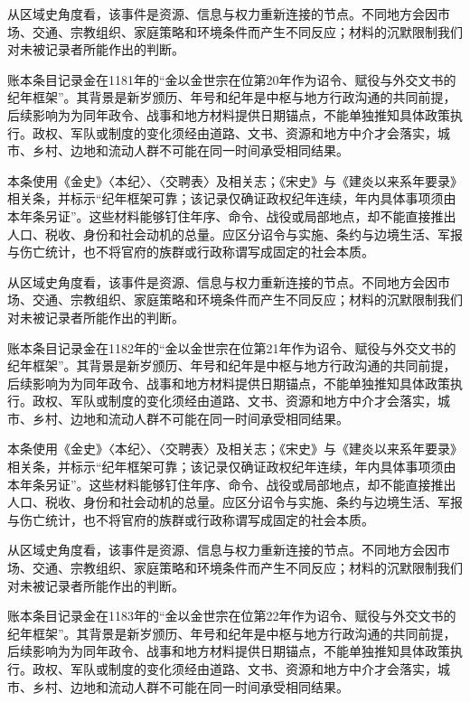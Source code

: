 从区域史角度看，该事件是资源、信息与权力重新连接的节点。不同地方会因市场、交通、宗教组织、家庭策略和环境条件而产生不同反应；材料的沉默限制我们对未被记录者所能作出的判断。

账本条目记录金在1181年的“金以金世宗在位第20年作为诏令、赋役与外交文书的纪年框架”。其背景是新岁颁历、年号和纪年是中枢与地方行政沟通的共同前提，后续影响为为同年政令、战事和地方材料提供日期锚点，不能单独推知具体政策执行。政权、军队或制度的变化须经由道路、文书、资源和地方中介才会落实，城市、乡村、边地和流动人群不可能在同一时间承受相同结果。

本条使用《金史》〈本纪〉、〈交聘表〉及相关志；《宋史》与《建炎以来系年要录》相关条，并标示“纪年框架可靠；该记录仅确证政权纪年连续，年内具体事项须由本年条另证”。这些材料能够钉住年序、命令、战役或局部地点，却不能直接推出人口、税收、身份和社会动机的总量。应区分诏令与实施、条约与边境生活、军报与伤亡统计，也不将官府的族群或行政称谓写成固定的社会本质。

从区域史角度看，该事件是资源、信息与权力重新连接的节点。不同地方会因市场、交通、宗教组织、家庭策略和环境条件而产生不同反应；材料的沉默限制我们对未被记录者所能作出的判断。

账本条目记录金在1182年的“金以金世宗在位第21年作为诏令、赋役与外交文书的纪年框架”。其背景是新岁颁历、年号和纪年是中枢与地方行政沟通的共同前提，后续影响为为同年政令、战事和地方材料提供日期锚点，不能单独推知具体政策执行。政权、军队或制度的变化须经由道路、文书、资源和地方中介才会落实，城市、乡村、边地和流动人群不可能在同一时间承受相同结果。

本条使用《金史》〈本纪〉、〈交聘表〉及相关志；《宋史》与《建炎以来系年要录》相关条，并标示“纪年框架可靠；该记录仅确证政权纪年连续，年内具体事项须由本年条另证”。这些材料能够钉住年序、命令、战役或局部地点，却不能直接推出人口、税收、身份和社会动机的总量。应区分诏令与实施、条约与边境生活、军报与伤亡统计，也不将官府的族群或行政称谓写成固定的社会本质。

从区域史角度看，该事件是资源、信息与权力重新连接的节点。不同地方会因市场、交通、宗教组织、家庭策略和环境条件而产生不同反应；材料的沉默限制我们对未被记录者所能作出的判断。

账本条目记录金在1183年的“金以金世宗在位第22年作为诏令、赋役与外交文书的纪年框架”。其背景是新岁颁历、年号和纪年是中枢与地方行政沟通的共同前提，后续影响为为同年政令、战事和地方材料提供日期锚点，不能单独推知具体政策执行。政权、军队或制度的变化须经由道路、文书、资源和地方中介才会落实，城市、乡村、边地和流动人群不可能在同一时间承受相同结果。

